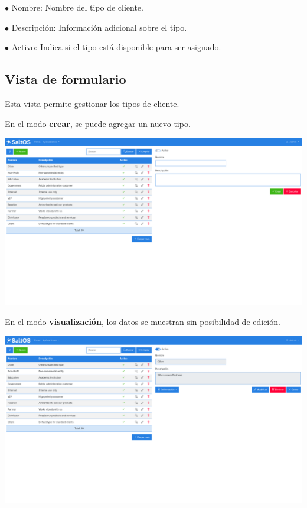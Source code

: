 \documentclass[a4paper]{article}
\begin{document}
\begin{compactitem}
\item[\color{myblue}$\bullet$] Nombre: Nombre del tipo de cliente.
\item[\color{myblue}$\bullet$] Descripción: Información adicional sobre el tipo.
\item[\color{myblue}$\bullet$] Activo: Indica si el tipo está disponible para ser asignado.
\end{compactitem}

\hypertarget{toc54}{}
\subsection{Vista de formulario}

Esta vista permite gestionar los tipos de cliente.

En el modo \textbf{crear}, se puede agregar un nuevo tipo.

\begin{center}\includegraphics[width=1\textwidth]{../ujest/snaps/test-screenshots-js-screenshots-crm-customers-types-create-es-es-1-snap.png}\end{center}

En el modo \textbf{visualización}, los datos se muestran sin posibilidad de edición.

\begin{center}\includegraphics[width=1\textwidth]{../ujest/snaps/test-screenshots-js-screenshots-crm-customers-types-view-10-es-es-1-snap.png}\end{center}
\end{document}
